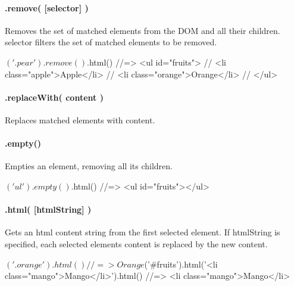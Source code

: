 \paragraph*{.remove( \mbox{[}selector\mbox{]} )}

Removes the set of matched elements from the D\+OM and all their children. {\ttfamily selector} filters the set of matched elements to be removed.


\begin{DoxyCode}
$('.pear').remove()
$.html()
//=>  <ul id="fruits">
//      <li class="apple">Apple</li>
//      <li class="orange">Orange</li>
//    </ul>
\end{DoxyCode}


\paragraph*{.replace\+With( content )}

Replaces matched elements with {\ttfamily content}.




\paragraph*{.empty()}

Empties an element, removing all its children.


\begin{DoxyCode}
$('ul').empty()
$.html()
//=>  <ul id="fruits"></ul>
\end{DoxyCode}


\paragraph*{.html( \mbox{[}html\+String\mbox{]} )}

Gets an html content string from the first selected element. If {\ttfamily html\+String} is specified, each selected element\textquotesingle{}s content is replaced by the new content.


\begin{DoxyCode}
$('.orange').html()
//=> Orange

$('#fruits').html('<li class="mango">Mango</li>').html()
//=> <li class="mango">Mango</li>
\end{DoxyCode}


